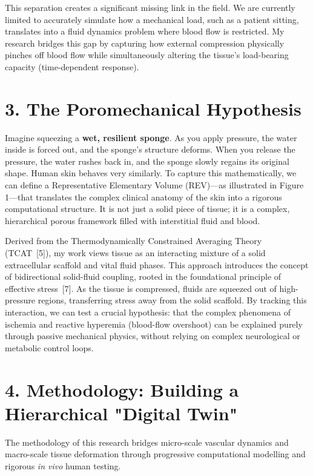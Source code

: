 \documentclass[11pt, a4paper]{article}
\begin{document}
This separation creates a significant missing link in the field. 
We are currently limited to accurately simulate how a mechanical load, such as a patient sitting, translates into a fluid dynamics problem where blood flow is restricted. 
My research bridges this gap by capturing how external compression physically pinches off blood flow while simultaneously altering the tissue's load-bearing capacity (time-dependent response).

\section*{3. The Poromechanical Hypothesis}
Imagine squeezing a \textbf{wet, resilient sponge}. 
As you apply pressure, the water inside is forced out, and the sponge's structure deforms. When you release the pressure, the water rushes back in, and the sponge slowly regains its original shape. 
Human skin behaves very similarly. 
To capture this mathematically, we can define a Representative Elementary Volume (REV)—as illustrated in Figure 1—that translates the complex clinical anatomy of the skin into a rigorous computational structure.
It is not just a solid piece of tissue; it is a complex, hierarchical porous framework filled with interstitial fluid and blood. 

Derived from the Thermodynamically Constrained Averaging Theory (TCAT~[5]), my work views tissue as an interacting mixture of a solid extracellular scaffold and vital fluid phases. 
This approach introduces the concept of bidirectional solid-fluid coupling, rooted in the foundational principle of effective stress~[7]. 
As the tissue is compressed, fluids are squeezed out of high-pressure regions, transferring stress away from the solid scaffold. 
By tracking this interaction, we can test a crucial hypothesis: that the complex phenomena of ischemia and reactive hyperemia (blood-flow overshoot) can be explained purely through passive mechanical physics, without relying on complex neurological or metabolic control loops.

\section*{4. Methodology: Building a Hierarchical "Digital Twin"}

The methodology of this research bridges micro-scale vascular dynamics and macro-scale tissue deformation through progressive computational modelling and rigorous \textit{in vivo} human testing. 
\end{document}
